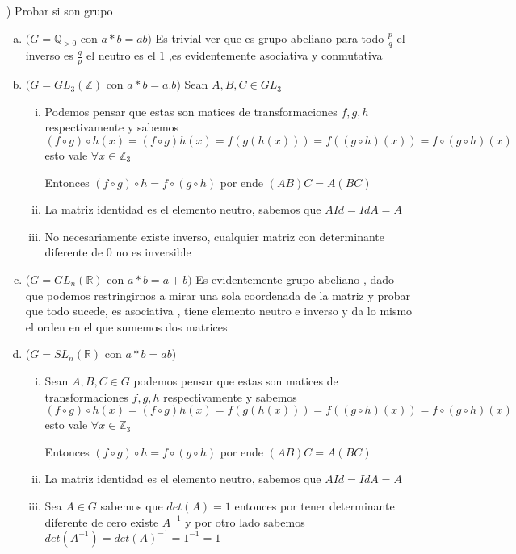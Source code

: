 \documentclass[12pt]{article}
\newcommand{\Q}{\mathbb{Q}}
\newcommand{\R}{\mathbb{R}}
\newcommand{\Z}{\mathbb{Z}}
\theoremstyle{definition}
\begin{document}
) Probar si son grupo 
\begin{enumerate}[(a)]
  \item $(G = \Q_{>0}$ con $ a*b = ab)$ Es trivial ver que es grupo abeliano para todo $\frac{p}{q}$ el inverso es $\frac{q}{p}$ el neutro es el $1$ ,es evidentemente asociativa y conmutativa
  \item $(G = GL_{3}(\Z)$ con $a*b = a.b)$ Sean $A,B,C \in GL_{3}$    
    \begin{enumerate}[i.]
      \item  Podemos pensar que estas son matices de transformaciones $f,g,h$ respectivamente y sabemos $(f \circ g) \circ h(x) = (f \circ g)h(x) = f(g ( h(x))) = f((g \circ h)(x)) = f \circ ( g \circ h) (x)$ esto vale $\forall x \in \Z_{3}$

	Entonces $(f \circ g) \circ h = f \circ (g \circ h)$ por ende $(AB)C = A(BC)$

      \item La matriz identidad es el elemento neutro, sabemos que $AId = IdA = A$

      \item No necesariamente existe inverso, cualquier matriz con determinante diferente de 0 no es inversible
   \end{enumerate}

 \item ($G = GL_{n}(\R)$ con $ a*b = a + b)$ Es evidentemente grupo abeliano , dado que podemos restringirnos a mirar una sola coordenada de la matriz y probar que todo sucede, es asociativa , tiene elemento neutro e inverso y da lo mismo el orden en el que sumemos dos matrices

 \item ($G = SL_{n}(\R)$ con $a*b = ab$)

   \begin{enumerate}[i.]
      \item  Sean $A,B,C \in G$ podemos pensar que estas son matices de transformaciones $f,g,h$ respectivamente y sabemos $(f \circ g) \circ h(x) = (f \circ g)h(x) = f(g ( h(x))) = f((g \circ h)(x)) = f \circ ( g \circ h) (x)$ esto vale $\forall x \in \Z_{3}$

	Entonces $(f \circ g) \circ h = f \circ (g \circ h)$ por ende $(AB)C = A(BC)$

      \item La matriz identidad es el elemento neutro, sabemos que $AId = IdA = A$

      \item Sea $A \in G$ sabemos que $det(A) = 1$ entonces por tener determinante diferente de cero existe $A^{-1}$ y por otro lado sabemos $det(A^{-1}) = det(A)^{-1} = 1 ^ {-1} = 1$ 


\end{enumerate}
\end{enumerate}
\end{document}
